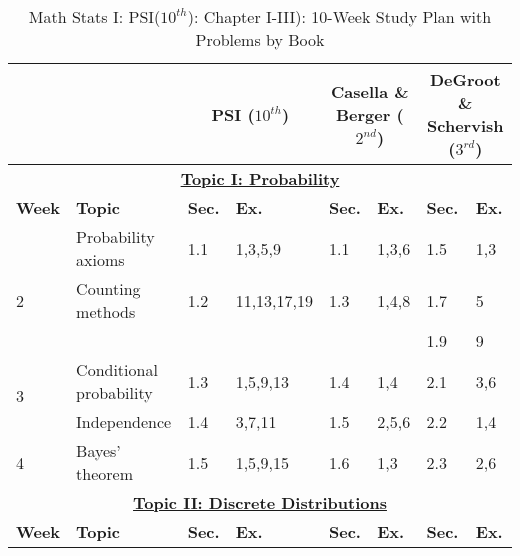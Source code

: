 \documentclass[12pt]{article}
\begin{document}
\begin{landscape}
\begin{table}[htbp]
\centering
\caption*{\small{Math Stats I: PSI}\footnotesize{($10^{th}$)}: \small{Chapter I-III): 10-Week Study Plan with Problems by Book}}


\begin{tabular}{%
    p{1.2cm}   %
    p{5cm}     %
    p{1cm}p{4cm}  %
    p{1cm}p{3.2cm}  %
    p{1cm}p{2.7cm}  %
  }
\toprule
\multicolumn{2}{c}{} &%
\multicolumn{2}{c}{\hspace*{-2.5cm}\textbf{PSI} \footnotesize{($10^{th}$)}} &%
\multicolumn{2}{c}{\hspace*{-2cm}\textbf{Casella \& Berger} \footnotesize{($2^{nd}$)}} &%
\multicolumn{2}{c}{\hspace*{-1cm}\textbf{DeGroot \& Schervish} \footnotesize{($3^{rd}$)}}\\
\midrule
\multicolumn{8}{c}{\textbf{\underline{Topic I: Probability}}}\\[2pt]
\addlinespace
\textbf{Week}   &
\textbf{Topic}  &
\textbf{Sec.}   & \textbf{Ex.} &
\textbf{Sec.}   & \textbf{Ex.} &
\textbf{Sec.}   & \textbf{Ex.}\\
\midrule
\addlinespace
1   & Probability axioms        & 1.1   & 1,3,5,9       & 1.1       & 1,3,6     & 1.5       & 1,3\\[10pt]
2   & Counting methods          & 1.2   & 11,13,17,19   & 1.3       & 1,4,8     & 1.7       & 5\\[2pt]
    &                           &       &               &           &           & 1.9       & 9\\[10pt]
\multirow{2}{*}{3} &
    Conditional probability     & 1.3   & 1,5,9,13      & 1.4       & 1,4       & 2.1       & 3,6\\[2pt]
    & Independence              & 1.4   & 3,7,11        & 1.5       & 2,5,6     & 2.2       & 1,4\\[10pt]
4   & Bayes’ theorem            & 1.5   & 1,5,9,15      & 1.6       & 1,3       & 2.3       & 2,6\\[2pt]
\midrule
\multicolumn{8}{c}{\textbf{\underline{Topic II: Discrete Distributions}}}\\[2pt]
\addlinespace
\textbf{Week}   &
\textbf{Topic}  &
\textbf{Sec.}   & \textbf{Ex.} &
\textbf{Sec.}   & \textbf{Ex.} &
\textbf{Sec.}   & \textbf{Ex.}\\
\midrule
    

\end{tabular}
\end{table}
\end{landscape}
\end{document}
